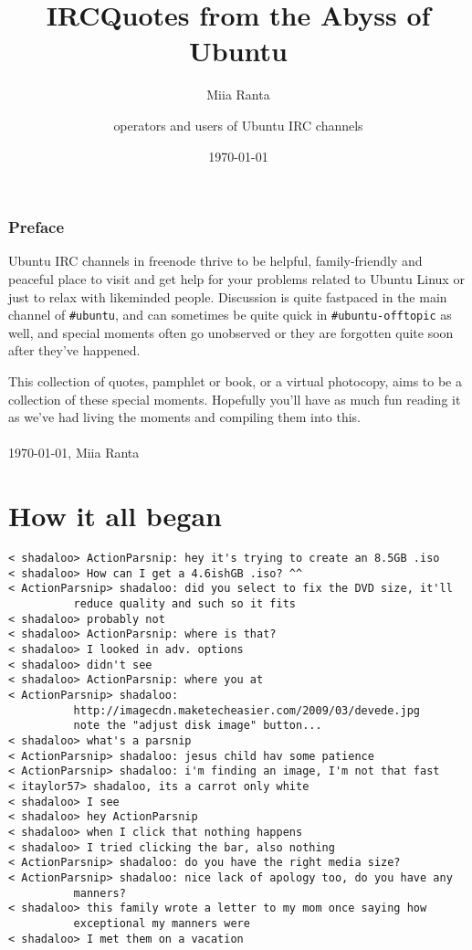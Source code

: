 \documentclass[a4paper]{book}
\title{IRCQuotes from the Abyss of Ubuntu}
\author{Miia Ranta \and operators and users of Ubuntu IRC channels}
\date{\today}
\begin{document}
\maketitle{}
\thispagestyle{empty}
\cleardoublepage{}

\pagestyle{headings}
\setcounter{page}{1}

\subsection*{Preface}

Ubuntu IRC channels in freenode thrive to be helpful, family-friendly 
and peaceful place to visit and get help for your problems related to 
Ubuntu Linux or just to relax with likeminded people. Discussion is quite 
fastpaced in the main channel of \verb$#ubuntu$, and can sometimes be quite 
quick in \verb$#ubuntu-offtopic$ as well, and special moments often go 
unobserved or they are forgotten quite soon after they've happened.

This collection of quotes, pamphlet or book, or a virtual photocopy, 
aims to be a collection of these special moments. Hopefully you'll 
have as much fun reading it as we've had living the moments and 
compiling them into this.
\\
\\
\today, Miia Ranta 
\tableofcontents
\cleardoublepage

\setcounter{page}{1}
\chapter{How it all began}

\begin{verbatim}
< shadaloo> ActionParsnip: hey it's trying to create an 8.5GB .iso
< shadaloo> How can I get a 4.6ishGB .iso? ^^
< ActionParsnip> shadaloo: did you select to fix the DVD size, it'll 
          reduce quality and such so it fits
< shadaloo> probably not
< shadaloo> ActionParsnip: where is that?
< shadaloo> I looked in adv. options
< shadaloo> didn't see
< shadaloo> ActionParsnip: where you at
< ActionParsnip> shadaloo: 
          http://imagecdn.maketecheasier.com/2009/03/devede.jpg
          note the "adjust disk image" button...
< shadaloo> what's a parsnip
< ActionParsnip> shadaloo: jesus child hav some patience
< ActionParsnip> shadaloo: i'm finding an image, I'm not that fast
< itaylor57> shadaloo, its a carrot only white
< shadaloo> I see
< shadaloo> hey ActionParsnip
< shadaloo> when I click that nothing happens
< shadaloo> I tried clicking the bar, also nothing
< ActionParsnip> shadaloo: do you have the right media size?
< ActionParsnip> shadaloo: nice lack of apology too, do you have any 
          manners?
< shadaloo> this family wrote a letter to my mom once saying how 
          exceptional my manners were
< shadaloo> I met them on a vacation
\end{verbatim}
\end{document}
